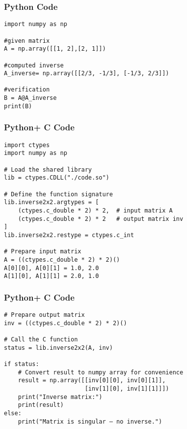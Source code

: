 \documentclass{beamer}
\begin{document}
\begin{frame}[fragile]
    \frametitle{Python Code}
\begin{lstlisting}
import numpy as np

#given matrix
A = np.array([[1, 2],[2, 1]])

#computed inverse
A_inverse= np.array([[2/3, -1/3], [-1/3, 2/3]])

#verification
B = A@A_inverse
print(B)
\end{lstlisting}
\end{frame}

\begin{frame}[fragile]
    \frametitle{Python+ C Code}
\begin{lstlisting}
import ctypes
import numpy as np

# Load the shared library
lib = ctypes.CDLL("./code.so")   

# Define the function signature
lib.inverse2x2.argtypes = [
    (ctypes.c_double * 2) * 2,  # input matrix A
    (ctypes.c_double * 2) * 2   # output matrix inv
]
lib.inverse2x2.restype = ctypes.c_int

# Prepare input matrix
A = ((ctypes.c_double * 2) * 2)()
A[0][0], A[0][1] = 1.0, 2.0
A[1][0], A[1][1] = 2.0, 1.0

\end{lstlisting}
\end{frame}

\begin{frame}[fragile]
    \frametitle{Python+ C Code}
\begin{lstlisting}
# Prepare output matrix
inv = ((ctypes.c_double * 2) * 2)()

# Call the C function
status = lib.inverse2x2(A, inv)

if status:
    # Convert result to numpy array for convenience
    result = np.array([[inv[0][0], inv[0][1]],
                       [inv[1][0], inv[1][1]]])
    print("Inverse matrix:")
    print(result)
else:
    print("Matrix is singular — no inverse.")

\end{lstlisting}
\end{frame}
\end{document}

